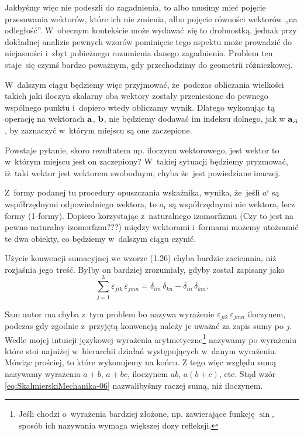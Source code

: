 \documentclass[a4paper,11pt]{article}
\numberwithin{equation}{section}
\begin{document}
Jakbyśmy więc nie podeszli do zagadnienia, to albo musimy mieć pojęcie
przesuwania wektorów, które ich nie zmienia, albo pojęcie równości wektorów
„na odległość”. W~obecnym kontekście może wydawać~się to drobnostką, jednak
przy dokładnej analizie pewnych wzorów pominięcie tego aspektu może
prowadzić do niejasności i~zbyt pobieżnego rozumienia danego zagadnienia.
Problem ten staje~się czymś bardzo poważnym, gdy przechodzimy do geometrii
różniczkowej.

W~dalszym ciągu będziemy więc przyjmować, że~podczas obliczania wielkości
takich jaki iloczyn skalarny oba wektory zostały przeniesione do pewnego
wspólnego punktu i~dopiero wtedy obliczamy wynik. Dlatego wykonując tą
operację na wektorach $\mathbf{a}$, $\mathbf{b}$, nie będziemy dodawać im
indeksu dolnego, jak w $\mathbf{a}_{ A }$, by zaznaczyć w~którym miejscu są
one zaczepione.

Powstaje pytanie, skoro rezultatem np. iloczynu wektorowego, jest wektor to
w~którym miejscu jest on zaczepiony? W~takiej sytuacji będziemy pryzmować,
iż~taki wektor jest wektorem swobodnym, chyba że~jest powiedziane inaczej.

\VerSpaceFour





\noindent
{} Z~formy podanej tu procedury opuszczania wskaźnika, wynika,
że~jeśli $a^{ i }$ są współrzędnymi odpowiedniego wektora, to $a_{ i }$ są
współrzędnymi nie wektora, lecz formy (1-formy). Dopiero korzystając
z~naturalnego izomorfizmu (Czy to jest na pewno naturalny izomorfizm???)
między wektorami i~formami możemy utożsamić te dwa obiekty, co będziemy
w~dalszym ciągu czynić.

\VerSpaceFour





\noindent
{} Użycie konwencji sumacyjnej we wzorze (1.26) chyba bardzie
zaciemnia, niż rozjaśnia jego treść. Byłby on bardziej zrozumiały, gdyby
został zapisany jako
\begin{equation}
  \label{eq:SkalmierskiMechanika-06}
  \sum_{ j = 1 }^{ 3 } \varepsilon_{ j i k } \, \varepsilon_{ j m n }
  = \delta_{ i m } \, \delta_{ k n } - \delta_{ i n } \, \delta_{ k m }.
\end{equation}

Sam autor ma chyba z~tym problem bo nazywa wyrażenie
$\varepsilon_{ j i k } \, \varepsilon_{ j m n }$ iloczynem, podczas gdy zgodnie z~przyjętą
konwencją należy je uważać za zapis sumy po $j$. Wedle mojej intuicji
językowej wyrażenia arytmetyczne\footnote{Jeśli chodzi o~wyrażenia bardziej
  złożone, np. zawierające funkcję $\sin$, sposób ich nazywania wymaga
  większej dozy refleksji.} nazywamy po wyrażeniu które stoi najniżej
w~hierarchii działań występujących w~danym wyrażeniu. Mówiąc prościej,
to które wykonujemy na końcu. Z tego więc względu sumą nazywamy wyrażenia
$a + b$, $a + bc$, iloczynem $ab$, $a ( b + c )$, etc. Stąd wzór
\eqref{eq:SkalmierskiMechanika-06} nazwalibyśmy raczej sumą, niż iloczynem.
\end{document}
